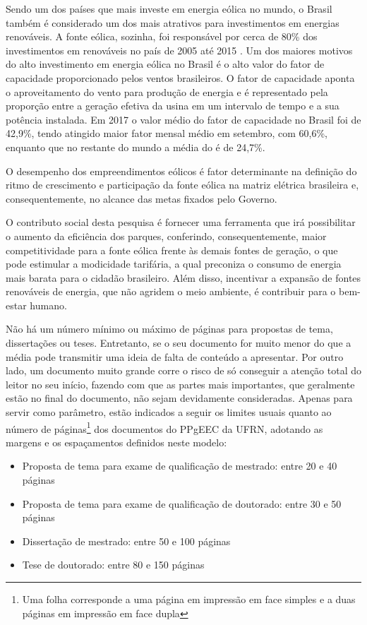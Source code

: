 Sendo um dos países que mais investe em energia eólica no mundo, o Brasil também é considerado um dos mais atrativos para investimentos em energias renováveis. A fonte eólica, sozinha, foi responsável por cerca de 80\% dos investimentos em renováveis no país de 2005 até 2015 \cite{CENARIO}. Um dos maiores motivos do alto investimento em energia eólica no Brasil é o alto valor do fator de capacidade proporcionado pelos ventos brasileiros. O fator de capacidade aponta o aproveitamento do vento para produção de energia e é representado pela proporção entre a geração efetiva da usina em um intervalo de tempo e a sua potência instalada. Em 2017 o valor médio do fator de capacidade no Brasil foi de 42,9\%, tendo atingido maior fator mensal médio em setembro, com 60,6\%, enquanto que no restante do mundo a média do é de 24,7\%.



O desempenho dos empreendimentos eólicos é fator determinante na definição do ritmo de crescimento e participação da fonte eólica na matriz elétrica brasileira e, consequentemente, no alcance das metas fixados pelo Governo.

O contributo social desta pesquisa é fornecer uma ferramenta que irá possibilitar o aumento da eficiência dos parques, conferindo, consequentemente, maior competitividade para a fonte eólica frente às demais fontes de geração, o que pode estimular a modicidade tarifária, a qual preconiza o consumo de energia mais barata para o cidadão brasileiro. Além disso, incentivar a expansão de fontes renováveis de energia, que não agridem o meio ambiente, é contribuir para o bem-estar humano.






Não há um número mínimo ou máximo de páginas para propostas de tema,
dissertações ou teses. Entretanto, se o seu documento for muito menor
do que a média pode transmitir uma ideia de falta de conteúdo a
apresentar. Por outro lado, um documento muito grande corre o risco de
só conseguir a atenção total do leitor no seu início, fazendo com que
as partes mais importantes, que geralmente estão no final do
documento, não sejam devidamente consideradas. Apenas para servir como
parâmetro, estão indicados a seguir os limites usuais quanto ao número
de páginas\footnote{Uma folha corresponde a uma página em impressão em
face simples e a duas páginas em impressão em face dupla} dos
documentos do PPgEEC da UFRN, adotando as margens e os espaçamentos
definidos neste modelo:
\begin{itemize}
\item Proposta de tema para exame de qualificação de mestrado:
entre 20 e 40 páginas
\item Proposta de tema para exame de qualificação de doutorado:
entre 30 e 50 páginas
\item Dissertação de mestrado:
entre 50 e 100 páginas
\item Tese de doutorado:
entre 80 e 150 páginas
\end{itemize}


